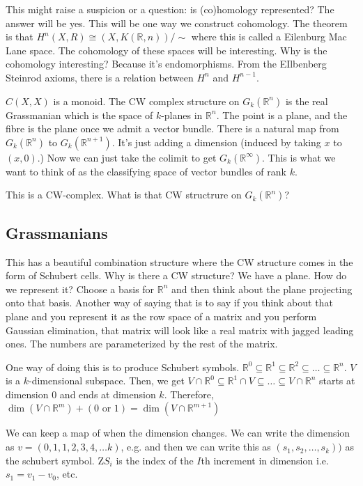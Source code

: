 \documentclass[12pt]{article}
\theoremstyle{definition}
\begin{document}
	This might raise a suspicion or a question: is (co)homology represented? The answer will be yes. This will be one way we construct cohomology. The theorem is that $H^n(X,R)\cong (X, K(\mathbb{R}, n))/\sim$ where this is called a Eilenburg Mac Lane space.  The cohomology of these spaces will be interesting. Why is the cohomology interesting? Because it's endomorphisms. From the EIlbenberg Steinrod axioms, there is a relation between $H^n$ and $H^{n-1}$. 
	
	$C(X,X)$ is a monoid. The CW complex structure on $G_k(\mathbb{R}^n)$ is the real Grassmanian which is the space of $k$-planes in $\mathbb{R}^n$.  The point is a plane, and the fibre is the plane once we admit a vector bundle. There is a natural map from $G_k(\mathbb{R}^n)$ to $G_k(\mathbb{R}^{n+1})$. It's just adding a dimension (induced by taking $x$ to $(x,0)$.) Now we can just take the colimit to get $G_k(\mathbb{R}^\infty)$. This is what we want to think of as the classifying space of vector bundles of rank $k$. 
	
	This is a CW-complex. What is that CW structrure on $G_k(\mathbb{R}^n)$?
	
	\subsection{Grassmanians}
	This has a beautiful combination structure where the CW structure comes in the form of Schubert cells. Why is there a CW structure? We have a plane. How do we represent it? Choose a basis for $\mathbb{R}^n$ and then think about the plane projecting onto that basis. Another way of saying that is to say if you think about that plane and you represent it as the row space of a matrix and you perform Gaussian elimination, that matrix will look like a real matrix with jagged leading ones. The numbers are parameterized by the rest of the matrix. 
	
	One way of doing this is to produce Schubert symbols. $\mathbb{R}^0\subseteq \mathbb{R}^1\subseteq \mathbb{R}^2\subseteq \dots \subseteq \mathbb{R}^n$.  $V$ is a $k$-dimensional subspace. Then, we get $V\cap \mathbb{R}^0\subseteq \mathbb{R}^1\cap V\subseteq \dots \subseteq V\cap \mathbb{R}^n$ starts at dimension $0$ and ends at dimension $k$. Therefore, $\dim(V\cap \mathbb{R}^m)+(0\text{ or }1)=\dim(V\cap \mathbb{R}^{m+1})$
	
	We can keep a map of when the dimension changes. We can write the dimension as $v=(0,1,1,2,3,4,\dots k)$, e.g. and then we can write this as $(s_1,s_2,\dots ,s_k))$ as the schubert symbol. Z$S_i$ is the index of the $I$th increment in dimension i.e. $s_1=v_1-v_0$, etc.
	
\end{document}
